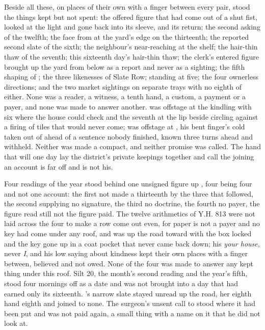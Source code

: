 Beside all these, on places of their own with a finger between every pair, stood the things kept but not spent: the offered figure that had come out of a shut fist, looked at the light and gone back into its sleeve, and its return; the second asking of the twelfth; the face from  at the yard's edge on the thirteenth; the reported second slate of the sixth; the neighbour's near-reaching at the shelf; the hair-thin thaw of the seventh; this sixteenth day's hair-thin thaw; the clerk's entered figure brought up the yard from  below  as a report and never as a sighting; the fifth shaping of ; the three likenesses of Slate Row;  standing at five; the four ownerless directions; and the two market sightings on separate trays with no eighth of either. None was a reader, a witness, a tenth hand, a custom, a payment or a payer, and none was made to answer another.  was offstage at the kindling with six where the house could check and the seventh at the lip beside  circling against a firing of tiles that would never come;  was offstage at , his bent finger's cold taken out of  ahead of a sentence nobody finished,  known three turns ahead and withheld. Neither was made a compact, and neither promise was called. The hand that will one day lay the district's private keepings together and call the joining an account is far off and is not his.

Four readings of the year stood behind one unsigned figure up , four being four and not one account: the first not made a thirteenth by the three that followed, the second supplying no signature, the third no doctrine, the fourth no payer, the figure read still not the figure paid. The twelve arithmetics of Y.H. 813 were not laid across the four to make a row come out even, for paper is not a payer and no key had come under any roof, and  was up the road toward  with the box locked and the key gone up in a coat pocket that never came back down; his \emph{your house}, never \emph{I}, and his low saying about kindness kept their own places with a finger between, believed and not owed. None of the four was made to answer any kept thing under this roof. Silt 20, the month's second reading and the year's fifth, stood four mornings off as a date and was not brought into a day that had earned only its sixteenth. 's narrow slate stayed unread up the road, her eighth hand eighth and joined to none. The surgeon's unsent call to  stood where it had been put and was not paid again, a small thing with a name on it that he did not look at.

